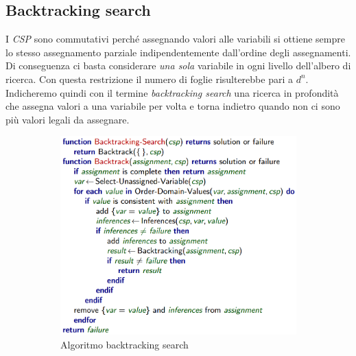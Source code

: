 \documentclass[11pt,oneside]{book}
\begin{document}
\subsection{Backtracking search}
I \textit{CSP} sono commutativi perché assegnando valori alle variabili si ottiene sempre lo stesso assegnamento parziale indipendentemente dall'ordine degli assegnamenti. Di conseguenza ci basta considerare \textit{una sola} variabile in ogni livello dell'albero di ricerca. Con questa restrizione il numero di foglie risulterebbe pari a $d^n$. Indicheremo quindi con il termine \textit{backtracking search} una ricerca in profondità che assegna valori a una variabile per volta e torna indietro quando non ci sono più valori legali da assegnare.
\begin{figure}[htp]
	\begin{subfigure}{0.49\textwidth}
	    \centering
		\includegraphics[width=\textwidth, height=\textheight, keepaspectratio]{backtracking-search.png}
		\caption{Algoritmo backtracking search}
	\end{subfigure}
	\hfill
	\begin{subfigure}{0.49\textwidth}
	    \centering

\end{subfigure}
\end{figure}
\end{document}
